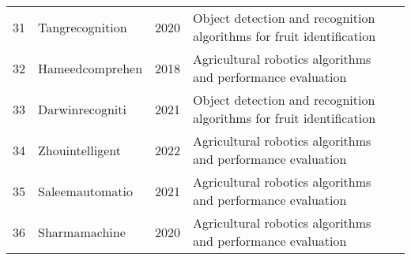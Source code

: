 \begin{table*}[htbp]
\begin{tabular}{p{}p{}p{}p{}p{}}
31 & Tangrecognition & 2020 & Object detection and recognition algorithms for fruit identification & \cite{tang2020recognition} \\
32 & Hameedcomprehen & 2018 & Agricultural robotics algorithms and performance evaluation & \cite{hameed2018comprehensive} \\
33 & Darwinrecogniti & 2021 & Object detection and recognition algorithms for fruit identification & \cite{darwin2021recognition} \\
34 & Zhouintelligent & 2022 & Agricultural robotics algorithms and performance evaluation & \cite{zhou2022intelligent} \\
35 & Saleemautomatio & 2021 & Agricultural robotics algorithms and performance evaluation & \cite{saleem2021automation} \\
36 & Sharmamachine & 2020 & Agricultural robotics algorithms and performance evaluation & \cite{sharma2020machine} \\
\bottomrule
\end{tabular}
\end{table*}

